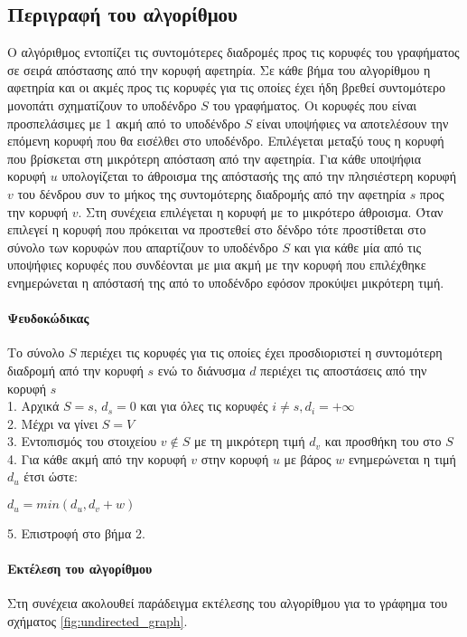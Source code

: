 \subsection{Περιγραφή του αλγορίθμου}
Ο αλγόριθμος εντοπίζει τις συντομότερες διαδρομές προς τις κορυφές του γραφήματος σε σειρά απόστασης από την κορυφή αφετηρία. Σε κάθε βήμα του αλγορίθμου η αφετηρία και οι ακμές προς τις κορυφές για τις οποίες έχει ήδη βρεθεί συντομότερο μονοπάτι σχηματίζουν το υποδένδρο $S$ του γραφήματος. Οι κορυφές που είναι προσπελάσιμες με 1 ακμή από το υποδένδρο $S$ είναι υποψήφιες να αποτελέσουν την επόμενη κορυφή που θα εισέλθει στο υποδένδρο. Επιλέγεται μεταξύ τους η κορυφή που βρίσκεται στη μικρότερη απόσταση από την αφετηρία. Για κάθε υποψήφια κορυφή $u$ υπολογίζεται το άθροισμα της απόστασής της από την πλησιέστερη κορυφή $v$ του δένδρου συν το μήκος της συντομότερης διαδρομής από την αφετηρία $s$ προς την κορυφή $v$. Στη συνέχεια επιλέγεται η κορυφή με το μικρότερο άθροισμα. Όταν επιλεγεί η κορυφή που πρόκειται να προστεθεί στο δένδρο τότε προστίθεται στο σύνολο των κορυφών που απαρτίζουν το υποδένδρο $S$  και για κάθε μία από τις υποψήφιες κορυφές που συνδέονται με μια ακμή με την κορυφή που επιλέχθηκε ενημερώνεται η απόστασή της από το υποδένδρο εφόσον προκύψει μικρότερη τιμή.

\paragraph{Ψευδοκώδικας}
Το σύνολο $S$ περιέχει τις κορυφές για τις οποίες έχει προσδιοριστεί η συντομότερη διαδρομή από την κορυφή $s$ ενώ το διάνυσμα $d$ περιέχει τις αποστάσεις από την κορυφή $s$ \\
1. Αρχικά $S={s}$, $d_s=0$ και για όλες τις κορυφές $i \neq s, d_i=+\infty$ \\
2. Μέχρι να γίνει $S=V$ \\
3. Εντοπισμός του στοιχείου $v \notin S$ με τη μικρότερη τιμή $d_v$ και προσθήκη του στο $S$ \\
4. Για κάθε ακμή από την κορυφή $v$ στην κορυφή $u$ με βάρος $w$ ενημερώνεται η τιμή $d_u$ έτσι ώστε: \\
\centerline{$d_u=min(d_u, d_v+w)$}
5. Επιστροφή στο βήμα 2.

\paragraph{Εκτέλεση του αλγορίθμου}
Στη συνέχεια ακολουθεί παράδειγμα εκτέλεσης του αλγορίθμου για το γράφημα του σχήματος \ref{fig:undirected_graph}.

